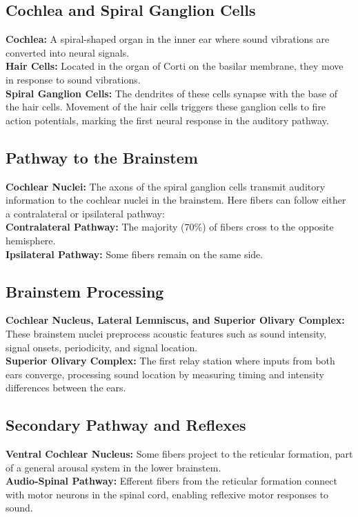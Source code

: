 \documentclass{article}
\begin{document}
\subsection{Cochlea and Spiral Ganglion Cells}
    \textbf{Cochlea:} A spiral-shaped organ in the inner ear where sound vibrations are converted into neural signals. \\
    \textbf{Hair Cells:} Located in the organ of Corti on the basilar membrane, they move in response to sound vibrations. \\
    \textbf{Spiral Ganglion Cells:} The dendrites of these cells synapse with the base of the hair cells. Movement of the hair cells triggers these ganglion cells to fire action potentials, marking the first neural response in the auditory pathway.
    
\subsection{Pathway to the Brainstem}
    \textbf{Cochlear Nuclei:} The axons of the spiral ganglion cells transmit auditory information to the cochlear nuclei in the brainstem. Here fibers can follow either a contralateral or ipsilateral pathway: \\
    \textbf{Contralateral Pathway:} The majority (70\%) of fibers cross to the opposite hemisphere. \\
    \textbf{Ipsilateral Pathway:} Some fibers remain on the same side.
    
\subsection{Brainstem Processing}
\textbf{Cochlear Nucleus, Lateral Lemniscus, and Superior Olivary Complex:} These brainstem nuclei preprocess acoustic features such as sound intensity, signal onsets, periodicity, and signal location. \\
\textbf{Superior Olivary Complex:} The first relay station where inputs from both ears converge, processing sound location by measuring timing and intensity differences between the ears.

\subsection{Secondary Pathway and Reflexes}
\textbf{Ventral Cochlear Nucleus:} Some fibers project to the reticular formation, part of a general arousal system in the lower brainstem. \\
\textbf{Audio-Spinal Pathway:} Efferent fibers from the reticular formation connect with motor neurons in the spinal cord, enabling reflexive motor responses to sound.
\end{document}
